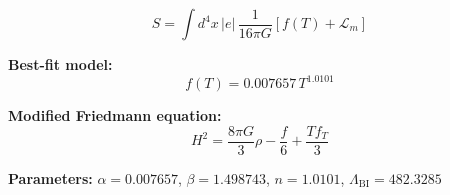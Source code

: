 
\begin{equation}
  S = \int d^4x \, |e| \, \frac{1}{16\pi G} \left[ f(T) + \mathcal{L}_m \right]
\end{equation}

\textbf{Best-fit model:}
\begin{equation}
  f(T) = 0.007657 \, T^{1.0101}
\end{equation}

\textbf{Modified Friedmann equation:}
\begin{equation}
  H^2 = \frac{8\pi G}{3} \rho - \frac{f}{6} + \frac{T f_T}{3}
\end{equation}

\textbf{Parameters:}
$\alpha = 0.007657$, \quad
$\beta = 1.498743$, \quad
$n = 1.0101$, \quad
$\Lambda_{\text{BI}} = 482.3285$